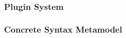 \begin{frame}
  \frametitle{Plugin System}
  \hspace{-1cm}
  \centering
  
\end{frame}

\begin{frame}
  \frametitle{Concrete Syntax Metamodel}
  \hspace{-1cm}
  \centering
  
\end{frame}